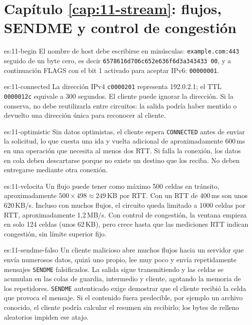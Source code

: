 \section*{Capítulo \ref{cap:11-stream}: flujos, SENDME y control de congestión}

\begin{soluzione}{es:11-begin}
El nombre de host debe escribirse en minúsculas: \texttt{example.com:443} seguido de un byte cero, es decir \texttt{6578616d706c652e636f6d3a343433 00}, y a continuación FLAGS con el bit 1 activado para aceptar IPv6: \texttt{00000001}.
\end{soluzione}

\begin{soluzione}{es:11-connected}
La dirección IPv4 \texttt{c0000201} representa 192.0.2.1; el TTL \texttt{0000012c} equivale a 300 segundos. El cliente puede ignorar la dirección. Si la conserva, no debe reutilizarla entre circuitos: la salida podría haber mentido o devuelto una dirección única para reconocer al cliente.
\end{soluzione}

\begin{soluzione}{es:11-optimistic}
Sin datos optimistas, el cliente espera \texttt{CONNECTED} antes de enviar la solicitud, lo que cuesta una ida y vuelta adicional de aproximadamente 600\,ms en una operación que necesita al menos dos RTT. Si falla la conexión, los datos en cola deben descartarse porque no existe un destino que los reciba. No deben entregarse mediante otra conexión.
\end{soluzione}

\begin{soluzione}{es:11-velocita}
Un flujo puede tener como máximo 500 celdas en tránsito, aproximadamente $500\times498\approx249$\,KB por RTT. Con un RTT de 400\,ms son unos 620\,KB/s. Incluso con muchos flujos, el circuito queda limitado a \num{1000} celdas por RTT, aproximadamente 1,2\,MB/s. Con control de congestión, la ventana empieza en solo 124 celdas (unos 62\,KB), pero crece hasta que las mediciones RTT indican congestión, sin límite superior fijo.
\end{soluzione}

\begin{soluzione}{es:11-sendme-falso}
Un cliente malicioso abre muchos flujos hacia un servidor que envía numerosos datos, quizá uno propio, lee muy poco y envía repetidamente mensajes \texttt{SENDME} falsificados. La salida sigue transmitiendo y las celdas se acumulan en las colas de guardia, intermedio y cliente, agotando la memoria de los repetidores. \texttt{SENDME} autenticado exige demostrar que el cliente recibió la celda que provoca el mensaje. Si el contenido fuera predecible, por ejemplo un archivo conocido, el cliente podría calcular el resumen sin recibirlo; los bytes de relleno aleatorios impiden ese atajo.
\end{soluzione}

